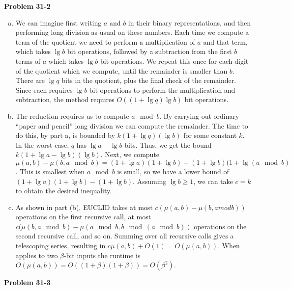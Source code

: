 \documentclass{article}
\begin{document}
\noindent\textbf{Problem 31-2}\\

\begin{enumerate}[a.]
\item We can imagine first writing $a$ and $b$ in their binary representations, and then performing long division as usual on these numbers.  Each time we compute a term of the quotient we need to perform a multiplication of $a$ and that term, which takes $\lg b$ bit operations, followed by a subtraction from the first $b$ terms of $a$ which takes $\lg b$ bit operations.  We repeat this once for each digit of the quotient which we compute, until the remainder is smaller than $b$.  There are $\lg q$ bits in the quotient, plus the final check of the remainder.  Since each requires $\lg b$ bit operations to perform the multiplication and subtraction, the method requires $O((1 + \lg q)\lg b)$ bit operations. \\

\item The reduction requires us to compute $a \mod b$.  By carrying out ordinary ``paper and pencil'' long division we can compute the remainder.  The time to do this, by part a, is bounded by $k(1 + \lg q)(\lg b)$ for some constant $k$.  In the worst case, $q$ has $\lg a - \lg b$ bits.  Thus, we get the bound $k(1 + \lg a - \lg b)(\lg b)$.  Next, we compute $\mu(a,b) - \mu(b,a \mod b) = (1+\lg a)(1+\lg b) - (1 + \lg b)(1+\lg(a \mod b)$.  This is smallest when $a \mod b$ is small, so we have a lower bound of $(1+\lg a)(1+\lg b) - (1+\lg b)$.  Assuming $\lg b \geq 1$, we can take $c = k$ to obtain the desired inequality. 

\item As shown in part (b), EUCLID takes at most $c(\mu(a,b) - \mu(b,a mod b))$ operations on the first recursive call, at most $c(\mu(b,a\mod b) - \mu(a \mod b, b \mod (a \mod b))$ operations on the second recursive call, and so on. Summing over all recursive calls gives a telescoping series, resulting in $c\mu(a,b) + O(1) = O(\mu(a,b))$. When applies to two $\beta$-bit inputs the runtime is $O(\mu(a,b)) = O((1+\beta)(1+\beta)) = O(\beta^2)$. 
\end{enumerate}


\noindent\textbf{Problem 31-3}\\
\end{document}
